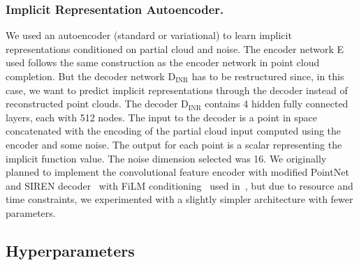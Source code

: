         \subsubsection{Implicit Representation Autoencoder.}
        We used an autoencoder (standard or variational) to learn implicit representations conditioned on partial cloud and noise. The encoder network E used follows the same construction as the encoder network in point cloud completion. But the decoder network D$_\text{INR}$ has to be restructured since, in this case, we want to predict implicit representations through the decoder instead of reconstructed point clouds. The decoder D$_\text{INR}$ contains 4 hidden fully connected layers, each with 512 nodes. The input to the decoder is a point in space concatenated with the encoding of the partial cloud input computed using the encoder and some noise. The output for each point is a scalar representing the implicit function value. The noise dimension selected was 16. We originally planned to implement the convolutional feature encoder with modified PointNet~\cite{PointNet} and SIREN decoder~\cite{SIREN} with FiLM conditioning~\cite{FiLM} used in~\cite{NeuralHessian}, but due to resource and time constraints, we experimented with a slightly simpler architecture with fewer parameters.


    \subsection{Hyperparameters}

